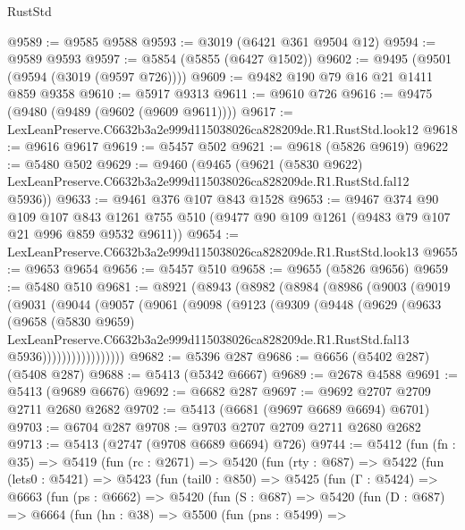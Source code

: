 \begin{lexlean}{RustStd}
\begin{coremodule}
@9589 := @9585 @9588
@9593 := @3019 (@6421 @361 @9504 @12)
@9594 := @9589 @9593
@9597 := @5854 (@5855 (@6427 @1502))
@9602 := @9495 (@9501 (@9594 (@3019 (@9597 @726))))
@9609 := @9482 @190 @79 @16 @21 @1411 @859 @9358
@9610 := @5917 @9313
@9611 := @9610 @726
@9616 := @9475 (@9480 (@9489 (@9602 (@9609 @9611))))
@9617 := LexLeanPreserve.C6632b3a2e999d115038026ca828209de.R1.RustStd.look12
@9618 := @9616 @9617
@9619 := @5457 @502
@9621 := @9618 (@5826 @9619)
@9622 := @5480 @502
@9629 := @9460
    (@9465
      (@9621
        (@5830 @9622)
        LexLeanPreserve.C6632b3a2e999d115038026ca828209de.R1.RustStd.fal12
        @5936))
@9633 := @9461 @376 @107 @843 @1528
@9653 := @9467
    @374
    @90
    @109
    @107
    @843
    @1261
    @755
    @510
    (@9477 @90 @109 @1261 (@9483 @79 @107 @21 @996 @859 @9532 @9611))
@9654 := LexLeanPreserve.C6632b3a2e999d115038026ca828209de.R1.RustStd.look13
@9655 := @9653 @9654
@9656 := @5457 @510
@9658 := @9655 (@5826 @9656)
@9659 := @5480 @510
@9681 := @8921
    (@8943
      (@8982
        (@8984
          (@8986
            (@9003
              (@9019
                (@9031
                  (@9044
                    (@9057
                      (@9061
                        (@9098
                          (@9123
                            (@9309
                              (@9448
                                (@9629
                                  (@9633
                                    (@9658
                                      (@5830 @9659)
                                      LexLeanPreserve.C6632b3a2e999d115038026ca828209de.R1.RustStd.fal13
                                      @5936)))))))))))))))))
@9682 := @5396 @287
@9686 := @6656 (@5402 @287) (@5408 @287)
@9688 := @5413 (@5342 @6667)
@9689 := @2678 @4588
@9691 := @5413 (@9689 @6676)
@9692 := @6682 @287
@9697 := @9692 @2707 @2709 @2711 @2680 @2682
@9702 := @5413 (@6681 (@9697 @6689 @6694) @6701)
@9703 := @6704 @287
@9708 := @9703 @2707 @2709 @2711 @2680 @2682
@9713 := @5413 (@2747 (@9708 @6689 @6694) @726)
@9744 := @5412
    (fun (fn : @35) =>
    @5419
      (fun (rc : @2671) =>
      @5420
        (fun (rty : @687) =>
        @5422
          (fun (lets0 : @5421) =>
          @5423
            (fun (tail0 : @850) =>
            @5425
              (fun (Γ : @5424) =>
              @6663
                (fun (ps : @6662) =>
                @5420
                  (fun (S : @687) =>
                  @5420
                    (fun (D : @687) =>
                    @6664
                      (fun (hn : @38) =>
                      @5500
                        (fun (pns : @5499) =>

\end{coremodule}
\end{lexlean}
